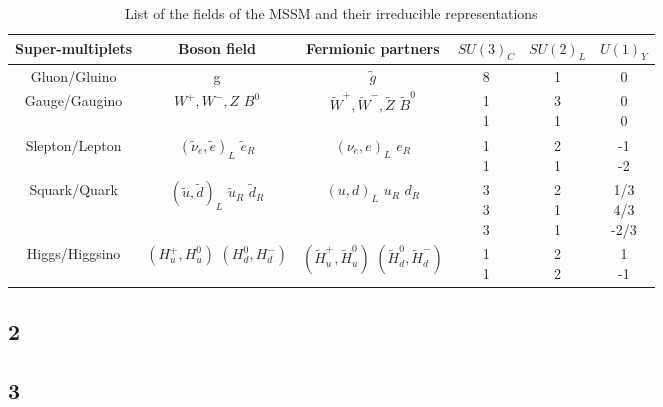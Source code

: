 \begin{table}[htbp]
\fontsize{10 pt}{1.2 em}
\selectfont
\begin{centering}
\caption{\label{tab:c2mssmf}List of the fields of the MSSM and their irreducible representations}
\hspace*{-4ex}
\begin{tabular}{|c|c|c|c|c|c|}
\hline
Super-multiplets & Boson field & Fermionic partners & $SU(3)_{C}$ & $SU(2)_{L}$ & $U(1)_{Y}$ \\
\hline
Gluon/Gluino     & g & $\tilde{g}$ & 8 & 1 & 0 \\
\hline
Gauge/Gaugino    & \specialcell{$W^{+},W^{-},Z$ \\ $B^{0}$} & \specialcell{$\tilde{W}^{+},\tilde{W}^{-},\tilde{Z}$ \\ $\tilde{B}^{0}$} & \specialcell{1 \\ 1} & \specialcell{3 \\ 1} & \specialcell{0 \\ 0} \\
\hline
Slepton/Lepton   & \specialcell{$(\tilde{\nu}_{e},\tilde{e})_{L}$ \\ $\tilde{e}_{R}$} & \specialcell{$(\nu_{e},e)_{L}$ \\ $e_{R}$} & \specialcell{1 \\ 1} & \specialcell{2 \\ 1} & \specialcell{-1 \\ -2} \\
\hline
Squark/Quark     & \specialcell{$(\tilde{u},\tilde{d})_{L}$ \\ $\tilde{u}_{R}$ \\ $\tilde{d}_{R}$} & \specialcell{$(u,d)_{L}$ \\ $u_{R}$ \\ $d_{R}$} & \specialcell{3 \\ 3 \\ 3} & \specialcell{2 \\ 1 \\ 1} & \specialcell{1/3 \\ 4/3 \\ -2/3} \\
\hline
Higgs/Higgsino   & \specialcell{$(H_{u}^{+},H_{u}^{0})$ \\ $(H_{d}^{0},H_{d}^{-})$} & \specialcell{$(\tilde{H}_{u}^{+},\tilde{H}_{u}^{0})$ \\ $(\tilde{H}_{d}^{0},\tilde{H}_{d}^{-})$} & \specialcell{1 \\ 1} & \specialcell{2 \\ 2} & \specialcell{1 \\ -1} \\
\hline
\end{tabular}
\par\end{centering}
\end{table}

\clearpage
\subsection{2}
\clearpage
\subsection{3}
